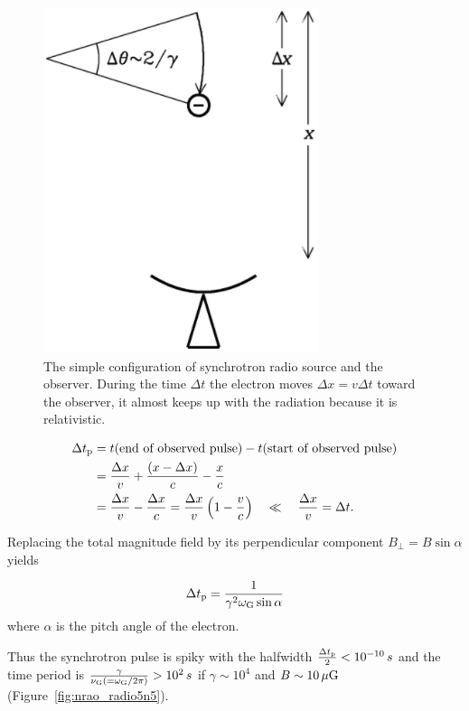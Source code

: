 \begin{figure}[htbp]
	\centering
	\includegraphics[width=.4\linewidth]{Chapter_2/Figures/NRAO_radio5n4.png}
    \caption[Simple condiguration of the synchrotron source and observer]{\label{fig:nrao_radio5n4}
        The simple configuration of synchrotron radio source and the observer.
        During the time $\Delta t$ the electron moves $\Delta x = v\Delta t$ toward the observer, it almost keeps up with the radiation because it is relativistic.
    }
\end{figure}

\begin{equation}\label{eq:essential_radio5n54}
    \begin{aligned}
        \Delta t_{\mathrm{p}} &=t(\text{end of observed pulse})-t(\text{start of observed pulse}) \\
                              &=\frac{\Delta x}{v}+\frac{(x-\Delta x)}{c}-\frac{x}{c} \\
                              &= \frac{\Delta x}{v}-\frac{\Delta x}{c}=\frac{\Delta x}{v}\left(1-\frac{v}{c}\right) \quad \ll \quad \frac{\Delta x}{v}=\Delta t.
    \end{aligned}
\end{equation}

Replacing the total magnitude field by its perpendicular component $B_{\perp} = B\sin\alpha$ yields

\begin{equation}\label{eq:essential_radio5n60}
    \Delta t_{\mathrm{p}} = \frac{1}{\gamma^2 \omega_{\mathrm{G}} \sin \alpha}
\end{equation}
where $\alpha$ is the pitch angle of the electron.

Thus the synchrotron pulse is spiky with the halfwidth $\frac{\Delta t_{\mathrm{p}}}{2} < 10^{-10}\,s$ and the time period is $\frac{\gamma}{\nu_{\mathrm{G}} \left(=\omega_{\mathrm{G}} / 2\pi\right)} > 10^2\,s$ if $\gamma \sim 10^4$ and $B \sim 10\,\mathrm{\mu G}$ (Figure~\ref{fig:nrao_radio5n5}).

